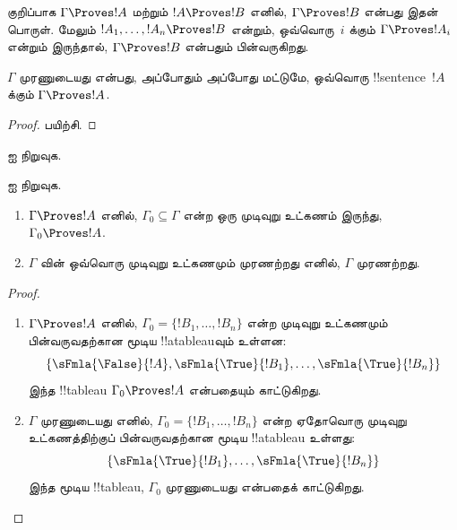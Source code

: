 \documentclass[../../../include/open-logic-section]{subfiles}
\begin{document}
குறிப்பாக $\Gamma \Proves !A$ மற்றும் $!A \Proves !B$ எனில், $\Gamma
\Proves !B$ என்பது இதன் பொருள். மேலும் $!A_1, \dots, !A_n \Proves !B$
என்றும், ஒவ்வொரு~$i$ க்கும் $\Gamma \Proves !A_i$ என்றும் இருந்தால்,
$\Gamma \Proves !B$ என்பதும் பின்வருகிறது.

\begin{prop}
$\Gamma$ முரணுடையது என்பது, அப்போதும் அப்போது மட்டுமே, ஒவ்வொரு
!!{sentence}~$!A$ க்கும் $\Gamma \Proves !A$.
\end{prop}

\begin{proof}
பயிற்சி.
\end{proof}

\begin{prob}
 ஐ நிறுவுக.
\end{prob}
\tagendprob

\begin{prob}
 ஐ நிறுவுக.
\end{prob}
\tagendprob

\begin{prop}[இறுக்கத்தன்மை]
  \begin{enumerate}
  \item $\Gamma \Proves !A$ எனில், $\Gamma_0 \subseteq \Gamma$ என்ற ஒரு
    முடிவுறு உட்கணம் இருந்து, $\Gamma_0 \Proves !A$.
  \item $\Gamma$ வின் ஒவ்வொரு முடிவுறு உட்கணமும் முரணற்றது எனில்,
    $\Gamma$ முரணற்றது.
  \end{enumerate}
\end{prop}

\begin{proof}
  \begin{enumerate}
    \item $\Gamma \Proves !A$ எனில், $\Gamma_0 = \{!B_1, \dots, !B_n\}$
      என்ற முடிவுறு உட்கணமும் பின்வருவதற்கான மூடிய !!a{tableau}வும் உள்ளன:
      \[
      \{\sFmla{\False}{!A}, \sFmla{\True}{!B_1}, \dots, \sFmla{\True}{!B_n}\}
      \]
      இந்த !!{tableau} $\Gamma_0 \Proves !A$ என்பதையும் காட்டுகிறது.
    \item $\Gamma$ முரணுடையது எனில், $\Gamma_0 = \{!B_1, \dots, !B_n\}$
      என்ற ஏதோவொரு முடிவுறு உட்கணத்திற்குப் பின்வருவதற்கான மூடிய
      !!a{tableau} உள்ளது:
      \[
      \{\sFmla{\True}{!B_1}, \dots, \sFmla{\True}{!B_n}\}
      \]
      இந்த மூடிய !!{tableau}, $\Gamma_0$ முரணுடையது என்பதைக் காட்டுகிறது.
  \end{enumerate}
\end{proof}
\end{document}
